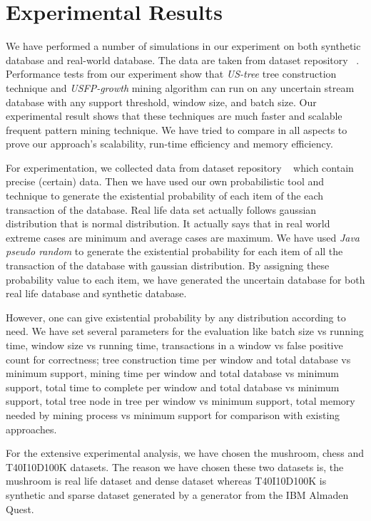 \documentclass[conference]{IEEEtran}
\begin{document}
\section{Experimental Results}\label{Experiment}
We have performed a number of simulations in our experiment on both synthetic database and real-world database. The data are taken from dataset repository ~\cite{dataset}. Performance tests from our experiment show that \emph{US-tree} tree construction technique and \emph{USFP-growth} mining algorithm can run on any uncertain stream database with any support threshold, window size, and batch size. Our experimental result shows that these techniques are much faster and scalable frequent pattern mining technique. We have tried to compare in all aspects to prove our approach's scalability, run-time efficiency and memory efficiency.  

For experimentation, we collected data from dataset repository ~\cite{dataset} which contain precise (certain) data. Then we have used our own probabilistic tool and technique to generate the existential probability of each item of the each transaction of the database. Real life data set actually follows gaussian distribution that is normal distribution. It actually says that in real world extreme cases are minimum and average cases are maximum. We have used \emph{Java pseudo random} to generate the existential probability for each item of all the transaction of the database with gaussian distribution. By assigning these probability value to each item, we have generated the uncertain database for both real life database and synthetic database. 

However, one can give existential probability by any distribution according to need. We have set several parameters for the evaluation like batch size vs running time, window size vs running time, transactions in a window vs false positive count for correctness; tree construction time per window and total database vs minimum support, mining time per window and total database vs minimum support, total time to complete per window and total database vs minimum support, total tree node in tree per window vs minimum support, total memory needed by mining process vs minimum support for comparison with existing approaches.

For the extensive experimental analysis, we have chosen the mushroom, chess and T40I10D100K datasets. The reason we have chosen these two datasets is, the mushroom  is real life dataset and dense dataset whereas T40I10D100K  is synthetic and sparse dataset generated by a generator from the IBM Almaden Quest.
     
\end{document}
